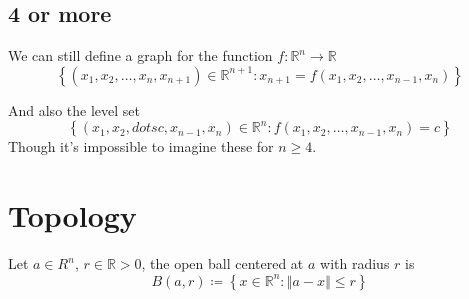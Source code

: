\documentclass[11pt]{book}
\begin{document}

\subsection{4 or more}%
\label{sub:4_or_more}

We can still define a graph for the function $f : \mathbb{R} ^{n}  \to \mathbb{R}  $ 
\[
    \left\{ \left( x_{1} , x_{2} , \dotsc  , x_{n } , x_{n + 1}  \right) \in \mathbb{R} ^{n + 1} : x_{n + 1} = f\left(x_{1} , x_{2} , \dotsc  , x_{n - 1} , x_{n} \right)   \right\} 
\]

And also the level set
\[
    \left\{ \left( x_{1} ,  x_{2} ,  dotsc ,  x_{n - 1} ,  x_{n}  \right) \in \mathbb{R} ^{n} : f\left(x_{1} , x_{2} , \dotsc  , x_{n - 1} , x_{n} \right) = c \right\} 
\]
Though it's impossible to imagine these for $n\ge 4$. 




\section{Topology}%
\label{sec:topology}

\begin{defn}\label{defn:open_ball}
    Let $a \in R^{n} $, $r \in \mathbb{R} > 0$,  the open ball centered at $a$ with radius $r$ is
    \[
    B\left(a, r\right) \coloneqq \left\{ x\in \mathbb{R} ^{n} : \left\Vert a - x \right\Vert \le r \right\} 
    \]
\end{defn}
\end{document}
